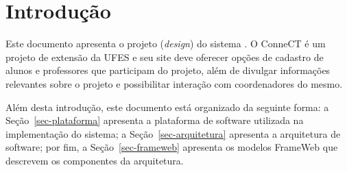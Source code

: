 \chapter{Introdução}
\label{sec-intro}
\vspace{-1cm}

Este documento apresenta o projeto (\textit{design}) do sistema \emph{\imprimirtitulo}. O ConneCT é um projeto de extensão da UFES e seu site deve oferecer opções de cadastro de alunos  e professores que participam do projeto, além de divulgar informações relevantes sobre o projeto e possibilitar interação com coordenadores do mesmo.


Além desta introdução, este documento está organizado da seguinte forma: 
a Seção~\ref{sec-plataforma} apresenta a plataforma de software utilizada na implementação do sistema; 
a Seção~\ref{sec-arquitetura} apresenta a arquitetura de software; por fim, 
a Seção~\ref{sec-frameweb} apresenta os modelos FrameWeb que descrevem os componentes da arquitetura.

